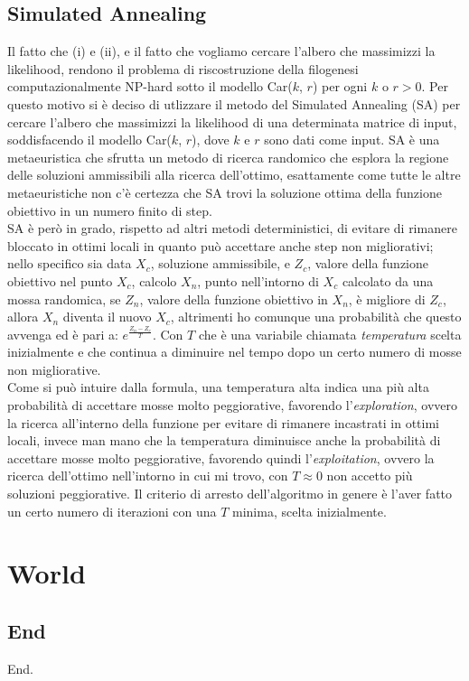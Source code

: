 \documentclass{report}
\begin{document}
\section{Simulated Annealing}
  Il fatto che (i) e (ii), e il fatto che vogliamo cercare l'albero che massimizzi la likelihood, rendono il problema di riscostruzione della filogenesi computazionalmente NP-hard sotto il modello Car($k$, $r$) per ogni $k$ o $r > 0$. Per questo motivo si è deciso di utlizzare il metodo del Simulated Annealing (SA) per cercare l'albero che massimizzi la likelihood di una determinata matrice di input, soddisfacendo il modello Car($k$, $r$), dove $k$ e $r$ sono dati come input.
  SA è una metaeuristica che sfrutta un metodo di ricerca randomico che esplora la regione delle soluzioni ammissibili alla ricerca dell'ottimo, esattamente come tutte le altre metaeuristiche non c'è certezza che SA trovi la soluzione ottima della funzione obiettivo in un numero finito di step.\\
  SA è però in grado, rispetto ad altri metodi deterministici, di evitare di rimanere bloccato in ottimi locali in quanto può accettare anche step non migliorativi; nello specifico sia data $X_{c}$, soluzione ammissibile, e $Z_{c}$, valore della funzione obiettivo nel punto $X_{c}$, calcolo $X_{n}$, punto nell'intorno di $X_{c}$ calcolato da una mossa randomica, se $Z_{n}$, valore della funzione obiettivo in $X_{n}$, è migliore di $Z_{c}$, allora $X_{n}$ diventa il nuovo $X_{c}$, altrimenti ho comunque una probabilità che questo avvenga ed è pari a: $e^{\frac{Z_{n}-Z_{c}}{T}}$.
  Con $T$ che è una variabile chiamata \emph{temperatura} scelta inizialmente e che continua a diminuire nel tempo dopo un certo numero di mosse non migliorative.\\
  Come si può intuire dalla formula, una temperatura alta indica una più alta probabilità di accettare mosse molto peggiorative, favorendo l'\emph{exploration}, ovvero la ricerca all'interno della funzione per evitare di rimanere incastrati in ottimi locali, invece man mano che la temperatura diminuisce anche la probabilità di accettare mosse molto peggiorative, favorendo quindi l'\emph{exploitation}, ovvero la ricerca dell'ottimo nell'intorno in cui mi trovo, con $T\approx 0$ non accetto più soluzioni peggiorative. Il criterio di arresto dell'algoritmo in genere è l'aver fatto un certo numero di iterazioni con una $T$ minima, scelta inizialmente.

\chapter{World}

\section{End}
  End.
\end{document}
